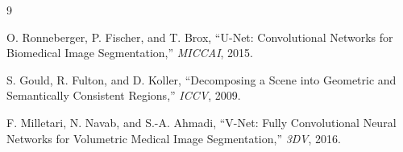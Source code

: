 \documentclass[12pt, a4paper]{article}
\begin{document}

\begin{thebibliography}{9}

O. Ronneberger, P. Fischer, and T. Brox,
``U-Net: Convolutional Networks for Biomedical Image Segmentation,''
\textit{MICCAI}, 2015.

S. Gould, R. Fulton, and D. Koller,
``Decomposing a Scene into Geometric and Semantically Consistent Regions,''
\textit{ICCV}, 2009.

F. Milletari, N. Navab, and S.-A. Ahmadi,
``V-Net: Fully Convolutional Neural Networks for Volumetric Medical Image Segmentation,''
\textit{3DV}, 2016.

\end{thebibliography}
\end{document}

